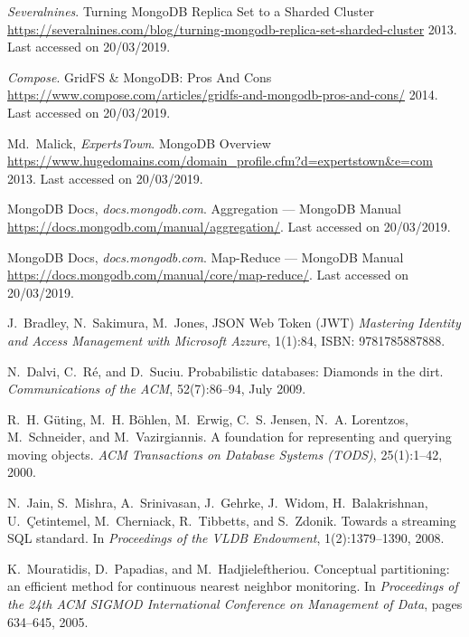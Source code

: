\begin{thebibliography}{1}
\bibitem{[MONGO3]} {\textlatin{
{{\em Severalnines}}.
Turning MongoDB Replica Set to a Sharded Cluster
\url{https://severalnines.com/blog/turning-mongodb-replica-set-sharded-cluster}
  2013. Last accessed on 20/03/2019}}.

\bibitem{[MONGO4]} {\textlatin{
{{\em Compose}}.
GridFS \& MongoDB: Pros And Cons
\url{https://www.compose.com/articles/gridfs-and-mongodb-pros-and-cons/}
  2014. Last accessed on 20/03/2019}}.

\bibitem{[MONGO5]} {\textlatin{
{Md.~Malick, {\em ExpertsTown}}.
MongoDB Overview
\url{https://www.hugedomains.com/domain_profile.cfm?d=expertstown&e=com}
  2013. Last accessed on 20/03/2019}}.

\bibitem{[MONGO6]} {\textlatin{
{MongoDB Docs, {\em docs.mongodb.com}}.
Aggregation — MongoDB Manual
\url{https://docs.mongodb.com/manual/aggregation/}. Last accessed on 20/03/2019}}.

\bibitem{[MONGO7]} {\textlatin{
{MongoDB Docs, {\em docs.mongodb.com}}.
Map-Reduce — MongoDB Manual
\url{https://docs.mongodb.com/manual/core/map-reduce/}. Last accessed on 20/03/2019}}.

\bibitem{[JWT1]} {\textlatin{
J.~Bradley, N.~Sakimura, M.~Jones,
JSON Web Token (JWT)
{\em  Mastering Identity and Access Management with Microsoft Azzure}, 1(1):84, ISBN: 9781785887888}}.








\bibitem{[DRS09]} {\textlatin{
N.~Dalvi, C.~R{\'e}, and D.~Suciu. Probabilistic databases: Diamonds in the dirt. {\em Communications of the ACM}, 52(7):86--94, July 2009}}.

\bibitem{[GBE+00]} {\textlatin{
R.~H. G{\"u}ting, M.~H. B{\"o}hlen, M.~Erwig, C.~S. Jensen, N.~A. Lorentzos,
  M.~Schneider, and M.~Vazirgiannis.
A foundation for representing and querying moving objects.
{\em ACM Transactions on Database Systems (TODS)}, 25(1):1--42, 2000}}.

\bibitem{[JMS+08]} {\textlatin{
N.~Jain, S.~Mishra, A.~Srinivasan, J.~Gehrke, J.~Widom, H.~Balakrishnan,
  U.~{\c{C}}etintemel, M.~Cherniack, R.~Tibbetts, and S.~Zdonik.
Towards a streaming {SQL} standard.
In {\em Proceedings of the VLDB Endowment}, 1(2):1379--1390, 2008}}.

\bibitem{[MHP05]} {\textlatin{
K.~Mouratidis, D.~Papadias, and M.~Hadjieleftheriou. 
Conceptual partitioning: an efficient method for continuous nearest
  neighbor monitoring.
In {\em Proceedings of the 24th ACM SIGMOD International
  Conference on Management of Data}, pages 634--645, 2005}}.


\end{thebibliography}
